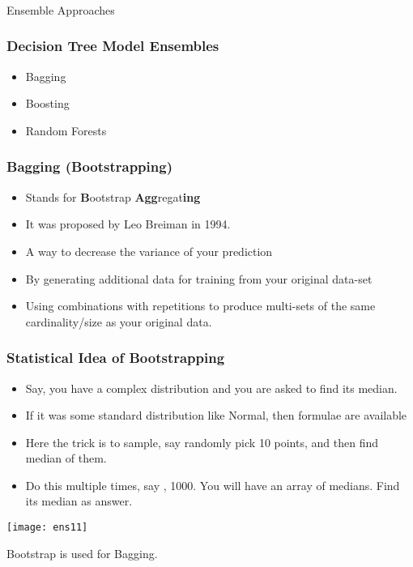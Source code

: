 \begin{frame}[fragile]\frametitle{}
\begin{center}
{\Large Ensemble Approaches}
\end{center}
\end{frame}

\begin{frame}[fragile]\frametitle{Decision Tree Model Ensembles}
\begin{itemize}
\item Bagging
\item Boosting
\item Random Forests
\end{itemize}
\end{frame}

\begin{frame}[fragile]\frametitle{Bagging (Bootstrapping)}
\begin{itemize}
\item Stands for {\bf B}ootstrap {\bf Agg}regat{\bf ing}
\item It was proposed by Leo Breiman in 1994.
\item A way to decrease the variance of your prediction
\item By generating additional data for training from your original data-set 
\item Using combinations with repetitions to produce multi-sets of the same cardinality/size as your original data.
\end{itemize}
\end{frame}

\begin{frame}[fragile]\frametitle{Statistical Idea of Bootstrapping}
\begin{itemize}
\item Say, you have a complex distribution and you are asked to find its median.
\item If it was some standard distribution like Normal, then formulae are available
\item Here the trick is to sample, say randomly pick 10 points, and then find median of them.
\item Do this multiple times, say , 1000. You will have an array of medians. Find its median as answer.
\end{itemize}

\begin{center}
\texttt{[image: ens11]}
\end{center}
Bootstrap is used for Bagging.
\end{frame}


